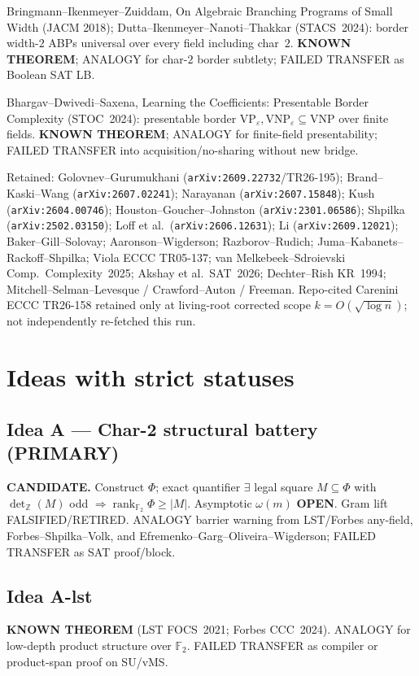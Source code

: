 \documentclass[11pt]{article}
\begin{document}
Bringmann--Ikenmeyer--Zuiddam, On Algebraic Branching Programs of Small Width (JACM 2018);
Dutta--Ikenmeyer--Nanoti--Thakkar (STACS~2024): border width-$2$ ABPs universal over every
field including char~$2$. \textbf{KNOWN THEOREM}; ANALOGY for char-$2$ border subtlety;
FAILED TRANSFER as Boolean SAT LB.

Bhargav--Dwivedi--Saxena, Learning the Coefficients: Presentable Border Complexity
(STOC~2024): presentable border $\mathrm{VP}_\varepsilon,\mathrm{VNP}_\varepsilon\subseteq\mathrm{VNP}$
over finite fields. \textbf{KNOWN THEOREM}; ANALOGY for finite-field presentability;
FAILED TRANSFER into acquisition/no-sharing without new bridge.

Retained: Golovnev--Gurumukhani (\texttt{arXiv:2609.22732}/TR26-195); Brand--Kaski--Wang
(\texttt{arXiv:2607.02241}); Narayanan (\texttt{arXiv:2607.15848}); Kush (\texttt{arXiv:2604.00746});
Houston--Goucher--Johnston (\texttt{arXiv:2301.06586}); Shpilka (\texttt{arXiv:2502.03150});
Loff et al.\ (\texttt{arXiv:2606.12631}); Li (\texttt{arXiv:2609.12021}); Baker--Gill--Solovay;
Aaronson--Wigderson; Razborov--Rudich; Juma--Kabanets--Rackoff--Shpilka; Viola ECCC TR05-137;
van Melkebeek--Sdroievski Comp.\ Complexity~2025; Akshay et al.\ SAT~2026; Dechter--Rish KR~1994;
Mitchell--Selman--Levesque / Crawford--Auton / Freeman. Repo-cited Carenini ECCC TR26-158
retained only at living-root corrected scope $k=O(\sqrt{\log n})$; not independently re-fetched
this run.

\section*{Ideas with strict statuses}
\subsection*{Idea A --- Char-2 structural battery (PRIMARY)}
\textbf{CANDIDATE.} Construct $\Phi$; exact quantifier
$\exists$ legal square $M\subseteq\Phi$ with $\det_{\mathbb Z}(M)$ odd
$\Rightarrow\operatorname{rank}_{\mathbb F_2}\Phi\ge|M|$. Asymptotic $\omega(m)$
\textbf{OPEN}. Gram lift FALSIFIED/RETIRED. ANALOGY barrier warning from LST/Forbes any-field,
Forbes--Shpilka--Volk, and Efremenko--Garg--Oliveira--Wigderson; FAILED TRANSFER as SAT
proof/block.

\subsection*{Idea A-lst}
\textbf{KNOWN THEOREM} (LST FOCS~2021; Forbes CCC~2024). ANALOGY for low-depth product
structure over $\mathbb F_2$. FAILED TRANSFER as compiler or product-span proof on SU/vMS.
\end{document}
